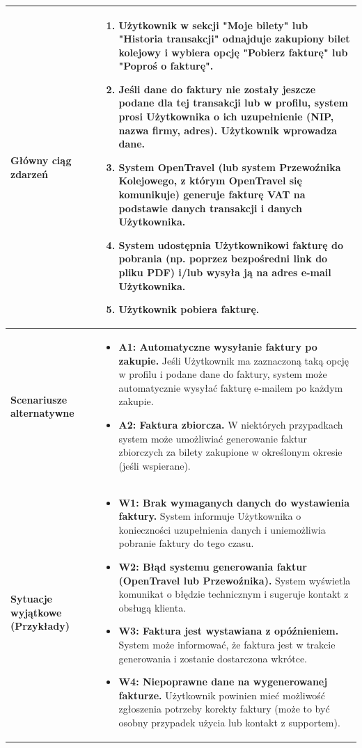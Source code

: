 \documentclass[a4paper,12pt]{article}
\begin{document}
\begin{longtable}{|p{\pierwszakolumnaszerokoscPUBKFaktura}|p{\drugakolumnaszerokoscPUBKFaktura}|}
    \hline
    \textbf{Główny ciąg zdarzeń} &
        \begin{enumerate} \itemsep0pt \parskip0pt \parsep0pt
            \item Użytkownik w sekcji "Moje bilety" lub "Historia transakcji" odnajduje zakupiony bilet kolejowy i wybiera opcję "Pobierz fakturę" lub "Poproś o fakturę".
            \item Jeśli dane do faktury nie zostały jeszcze podane dla tej transakcji lub w profilu, system prosi Użytkownika o ich uzupełnienie (NIP, nazwa firmy, adres). Użytkownik wprowadza dane.
            \item System OpenTravel (lub system Przewoźnika Kolejowego, z którym OpenTravel się komunikuje) generuje fakturę VAT na podstawie danych transakcji i danych Użytkownika.
            \item System udostępnia Użytkownikowi fakturę do pobrania (np. poprzez bezpośredni link do pliku PDF) i/lub wysyła ją na adres e-mail Użytkownika.
            \item Użytkownik pobiera fakturę.
        \end{enumerate} \\
    \hline
    \textbf{Scenariusze alternatywne} &
        \begin{itemize} \itemsep0pt \parskip0pt \parsep0pt
            \item \textbf{A1: Automatyczne wysyłanie faktury po zakupie.} Jeśli Użytkownik ma zaznaczoną taką opcję w profilu i podane dane do faktury, system może automatycznie wysyłać fakturę e-mailem po każdym zakupie.
            \item \textbf{A2: Faktura zbiorcza.} W niektórych przypadkach system może umożliwiać generowanie faktur zbiorczych za bilety zakupione w określonym okresie (jeśli wspierane).
        \end{itemize} \\
    \hline
    \textbf{Sytuacje wyjątkowe (Przykłady)} &
        \begin{itemize} \itemsep0pt \parskip0pt \parsep0pt
            \item \textbf{W1: Brak wymaganych danych do wystawienia faktury.} System informuje Użytkownika o konieczności uzupełnienia danych i uniemożliwia pobranie faktury do tego czasu.
            \item \textbf{W2: Błąd systemu generowania faktur (OpenTravel lub Przewoźnika).} System wyświetla komunikat o błędzie technicznym i sugeruje kontakt z obsługą klienta.
            \item \textbf{W3: Faktura jest wystawiana z opóźnieniem.} System może informować, że faktura jest w trakcie generowania i zostanie dostarczona wkrótce.
            \item \textbf{W4: Niepoprawne dane na wygenerowanej fakturze.} Użytkownik powinien mieć możliwość zgłoszenia potrzeby korekty faktury (może to być osobny przypadek użycia lub kontakt z supportem).
        \end{itemize} \\
\end{longtable}
\endgroup
\end{document}
